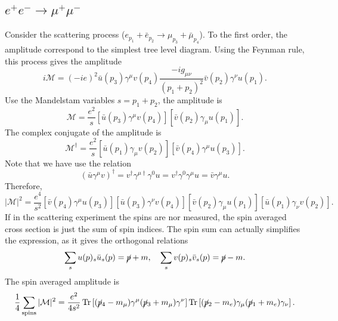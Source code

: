 \documentclass[aps,prb,superscriptaddress,nofootinbib]{revtex4}
\def \Tr{\operatorname{Tr}}
\begin{document}
\subsection{$e^+ e^- \rightarrow \mu^+ \mu^-$}
Consider the scattering process ($e_{p_1} + \bar{e}_{p_2} \rightarrow \mu_{p_3} + \bar{\mu}_{p_4}$). 
To the first order, the amplitude correspond to the simplest tree level diagram.
Using the Feynman rule, this process gives the amplitude
\begin{equation}
	i\mathcal M = (-ie)^2 \bar u(p_3) \gamma^\mu v(p_4) \frac{-i g_{\mu\nu}}{(p_1+p_2)^2} \bar v(p_2) \gamma^\nu u(p_1).
\end{equation}
Use the Mandelstam variables $s=p_1+p_2$, the amplitude is
\begin{equation}
	\mathcal M = \frac{e^2}{s} \left[\bar u(p_3) \gamma^\mu v(p_4) \right] \left[\bar v(p_2) \gamma_\mu u(p_1)\right].
\end{equation}
The complex conjugate of the amplitude is
\begin{equation}
	\mathcal M^\dagger = \frac{e^2}{s} \left[\bar u(p_1) \gamma_\mu v(p_2)\right] \left[\bar v(p_4) \gamma^\mu u(p_3) \right].
\end{equation}
Note that we have use the relation 
\begin{equation}
	(\bar u \gamma^\mu v)^\dagger
	= v^\dagger \gamma^{\mu\dagger} \gamma^0 u 
	= v^\dagger \gamma^0 \gamma^{\mu} u
	= \bar v \gamma^\mu u.
\end{equation}
Therefore,
\begin{equation}
	|\mathcal M|^2 = \frac{e^4}{s^2} \left[\bar v(p_4) \gamma^\mu u(p_3) \right] \left[\bar u(p_3) \gamma^\nu v(p_4) \right] \left[\bar v(p_2) \gamma_\mu u(p_1)\right] \left[\bar u(p_1) \gamma_\nu v(p_2)\right].
\end{equation}
If in the scattering experiment the spins are nor measured, the spin averaged cross section is just the sum of spin indices.
The spin sum can actually simplifies the expression, as it gives the orthogonal relations
\begin{equation}
	\sum_s u(p)_s \bar u_s(p) = \cancel p + m, \quad
	\sum_s v(p)_s \bar v_s(p) = \cancel p - m.
\end{equation}
The spin averaged amplitude is
\begin{equation}
	\frac{1}{4}\sum_{\mathrm{spins}}|\mathcal M|^2 
	= \frac{e^2}{4s^2} \Tr\left[(\cancel p_4 -m_\mu) \gamma^\mu (\cancel{p}_3 + m_\mu) \gamma^\nu \right] \Tr\left[(\cancel p_2-m_e) \gamma_\mu (\cancel p_1 +m_e) \gamma_\nu \right].
\end{equation}
\end{document}
